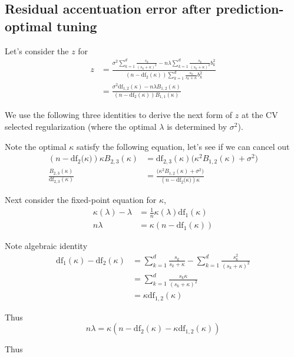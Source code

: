 \subsection{Residual accentuation error after prediction-optimal tuning}

Let's consider the $z$ for
\begin{align*}
z & =\frac{\sigma^{2}\sum_{k=1}^{d}\frac{s_{k}}{(s_{k}+\kappa)^{2}}-n\lambda\sum_{k=1}^{d}\frac{s_{k}}{(s_{k}+\kappa)^{2}}b_{k}^{2}}{(n-\mathrm{df}_{2}(\kappa))\sum_{k=1}^{d}\frac{s_{k}}{s_{k}+\kappa}b_{k}^{2}}\\
 & =\frac{\sigma^{2}\mathrm{df}_{1,2}(\kappa)-n\lambda B_{1,2}(\kappa)}{(n-\mathrm{df}_{2}(\kappa))B_{1,1}(\kappa)}
\end{align*}

We use the following three identities to derive the next form of $z$
at the CV selected regularization (where the optimal $\lambda$ is
determined by $\sigma^{2}$).

Note the optimal $\kappa$ satisfy the following equation, let's see
if we can cancel out
\begin{align*}
(n-\mathrm{df}_{2}\bigl(\kappa\bigr))\kappa B_{2,3}(\kappa) & =\mathrm{df}_{2,3}(\kappa)\big(\kappa^{2}B_{1,2}(\kappa)+\sigma^{2}\big)\\
\frac{B_{2,3}(\kappa)}{\mathrm{df}_{2,3}(\kappa)} & =\frac{\big(\kappa^{2}B_{1,2}(\kappa)+\sigma^{2}\big)}{(n-\mathrm{df}_{2}\bigl(\kappa\bigr))\kappa}
\end{align*}

Next consider the fixed-point equation for $\kappa$,
\begin{align*}
\kappa(\lambda)-\lambda & =\frac{1}{n}\kappa(\lambda)\mathrm{df}_{1}(\kappa)\\
n\lambda & =\kappa(n-\mathrm{df}_{1}(\kappa))
\end{align*}

Note algebraic identity
\begin{align*}
\mathrm{df}_{1}(\kappa)-\mathrm{df}_{2}(\kappa) & =\sum_{k=1}^{d}\frac{s_{k}}{s_{k}+\kappa}-\sum_{k=1}^{d}\frac{s_{k}^{2}}{(s_{k}+\kappa)^{2}}\\
 & =\sum_{k=1}^{d}\frac{s_{k}\kappa}{(s_{k}+\kappa)^{2}}\\
 & =\kappa\mathrm{df}_{1,2}(\kappa)
\end{align*}

Thus
\[
n\lambda=\kappa(n-\mathrm{df}_{2}(\kappa)-\kappa\mathrm{df}_{1,2}(\kappa))
\]

Thus

